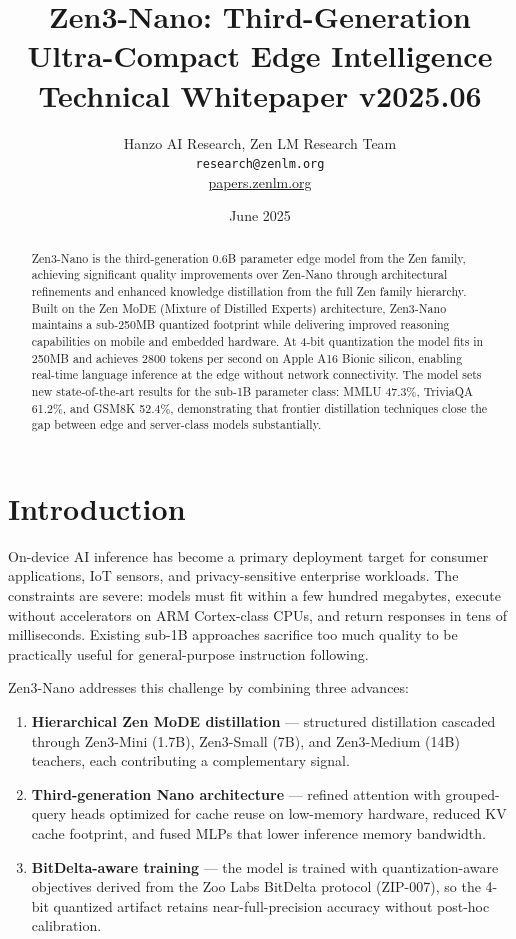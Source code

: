\documentclass[11pt,a4paper]{article}
\title{\textbf{Zen3-Nano: Third-Generation Ultra-Compact Edge Intelligence}\\
\large Technical Whitepaper v2025.06}
\author{Hanzo AI Research, Zen LM Research Team\\
\texttt{research@zenlm.org}\\
\href{https://papers.zenlm.org}{papers.zenlm.org}}
\date{June 2025}
\begin{document}
\maketitle

\begin{abstract}
Zen3-Nano is the third-generation 0.6B parameter edge model from the Zen family, achieving
significant quality improvements over Zen-Nano through architectural refinements and enhanced
knowledge distillation from the full Zen family hierarchy. Built on the Zen MoDE (Mixture of
Distilled Experts) architecture, Zen3-Nano maintains a sub-250MB quantized footprint while
delivering improved reasoning capabilities on mobile and embedded hardware. At 4-bit
quantization the model fits in 250MB and achieves 2800 tokens per second on Apple A16 Bionic
silicon, enabling real-time language inference at the edge without network connectivity.
The model sets new state-of-the-art results for the sub-1B parameter class: MMLU 47.3\%,
TriviaQA 61.2\%, and GSM8K 52.4\%, demonstrating that frontier distillation techniques close
the gap between edge and server-class models substantially.
\end{abstract}

\tableofcontents
\newpage

\section{Introduction}
\label{sec:intro}

On-device AI inference has become a primary deployment target for consumer applications,
IoT sensors, and privacy-sensitive enterprise workloads. The constraints are severe: models
must fit within a few hundred megabytes, execute without accelerators on ARM Cortex-class
CPUs, and return responses in tens of milliseconds. Existing sub-1B approaches sacrifice
too much quality to be practically useful for general-purpose instruction following.

Zen3-Nano addresses this challenge by combining three advances:

\begin{enumerate}
\item \textbf{Hierarchical Zen MoDE distillation} --- structured distillation cascaded through
      Zen3-Mini (1.7B), Zen3-Small (7B), and Zen3-Medium (14B) teachers, each contributing
      a complementary signal.
\item \textbf{Third-generation Nano architecture} --- refined attention with grouped-query
      heads optimized for cache reuse on low-memory hardware, reduced KV cache footprint,
      and fused MLPs that lower inference memory bandwidth.
\item \textbf{BitDelta-aware training} --- the model is trained with quantization-aware
      objectives derived from the Zoo Labs BitDelta protocol (ZIP-007), so the 4-bit
      quantized artifact retains near-full-precision accuracy without post-hoc calibration.
\end{enumerate}
\end{document}

